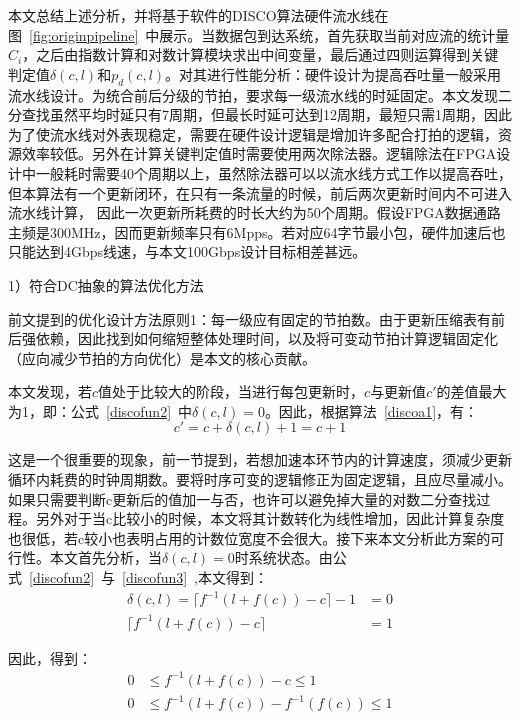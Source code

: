 本文总结上述分析，并将基于软件的DISCO算法硬件流水线在图~\ref{fig:originpipeline}~中展示。当数据包到达系统，首先获取当前对应流的统计量$ C_i $，之后由指数计算和对数计算模块求出中间变量，最后通过四则运算得到关键判定值$ \delta(c,l)$和$p_d(c,l) $。对其进行性能分析：硬件设计为提高吞吐量一般采用流水线设计。为统合前后分级的节拍，要求每一级流水线的时延固定。本文发现二分查找虽然平均时延只有7周期，但最长时延可达到12周期，最短只需1周期，因此为了使流水线对外表现稳定，需要在硬件设计逻辑是增加许多配合打拍的逻辑，资源效率较低。另外在计算关键判定值时需要使用两次除法器。逻辑除法在FPGA设计中一般耗时需要40个周期以上，虽然除法器可以以流水线方式工作以提高吞吐，但本算法有一个更新闭环，在只有一条流量的时候，前后两次更新时间内不可进入流水线计算，
因此一次更新所耗费的时长大约为50个周期。假设FPGA数据通路主频是300MHz，因而更新频率只有6Mpps。若对应64字节最小包，硬件加速后也只能达到4Gbps线速，与本文100Gbps设计目标相差甚远。

\label{chap354}

1）符合DC抽象的算法优化方法

前文提到的优化设计方法原则1：每一级应有固定的节拍数。由于更新压缩表有前后强依赖，因此找到如何缩短整体处理时间，以及将可变动节拍计算逻辑固定化（应向减少节拍的方向优化）是本文的核心贡献。

本文发现，若$ c $值处于比较大的阶段，当进行每包更新时，$ c $与更新值$ c' $的差值最大为1，即：公式~\ref{discofun2}~中$ \delta(c,l)=0$。因此，根据算法~\ref{discoa1}，有：
\begin{equation} \label{mydiscof1}
c'=c+\delta(c,l) + 1 =c+1
\end{equation}

这是一个很重要的现象，前一节提到，若想加速本环节内的计算速度，须减少更新循环内耗费的时钟周期数。要将时序可变的逻辑修正为固定逻辑，且应尽量减小。如果只需要判断c更新后的值加一与否，也许可以避免掉大量的对数二分查找过程。另外对于当c比较小的时候，本文将其计数转化为线性增加，因此计算复杂度也很低，若c较小也表明占用的计数位宽度不会很大。接下来本文分析此方案的可行性。本文首先分析，当$ \delta(c,l)=0$时系统状态。由公式~\ref{discofun2}~与~\ref{discofun3}~,本文得到：
\begin{align}
\delta(c,l) =  \lceil f^{-1}(l+f(c)) - c \rceil -1 &= 0 \nonumber \\
\lceil f^{-1}(l+f(c)) - c \rceil &= 1 %
\end{align}

因此，得到：
\begin{align}
0 &\leq f^{-1}(l+f(c)) - c \leq 1 \nonumber  \\
0 &\leq f^{-1}(l+f(c)) - f^{-1}(f(c)) \leq 1
\end{align}

